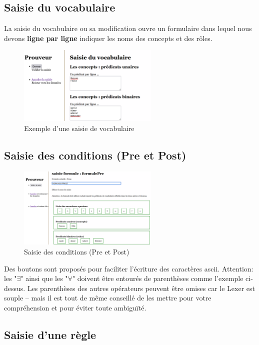 \documentclass[11pt,a4paper]{article}
\begin{document}
\subsection{Saisie du vocabulaire}
La saisie du vocabulaire ou sa modification ouvre un formulaire dans lequel nous devons \textbf{ligne par ligne} indiquer les noms des concepts et des rôles.
\begin{figure}[htbp]
  \centering
  \includegraphics[width=0.6\textwidth]{vocab.png}
  \caption{Exemple d'une saisie de vocabulaire}
  \label{fig:mon_image}
\end{figure}
\subsection{Saisie des conditions (Pre et Post)}
\begin{figure}[htbp]
  \centering
  \includegraphics[width=0.6\textwidth]{screen7.png}
  \caption{Saisie des conditions (Pre et Post)}
  \label{fig:mon_image}
\end{figure}
Des boutons sont proposés pour faciliter l'écriture des caractères ascii. Attention: les "$\exists$" ainsi que les "$\forall$" doivent être entourés de parenthèses comme l'exemple ci-dessus. Les parenthèses des autres opérateurs peuvent être omises car le Lexer est souple -- mais il est tout de même conseillé de les mettre pour votre compréhension et pour éviter toute ambiguïté.
\subsection{Saisie d'une règle}
\end{document}
